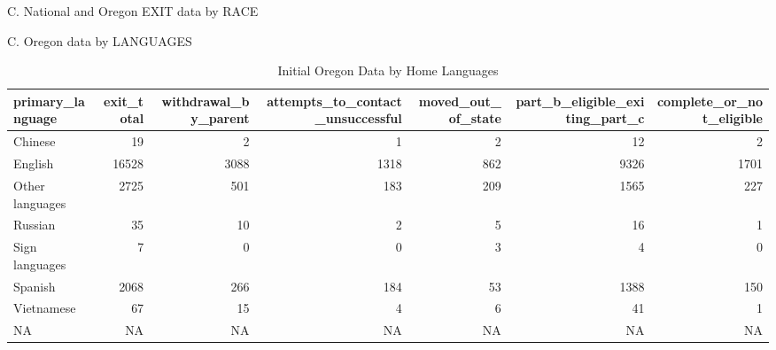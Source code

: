 \documentclass[
  letterpaper,
  DIV=11,
  numbers=noendperiod]{scrartcl}
\begin{document}
C. National and Oregon EXIT data by RACE

C. Oregon data by LANGUAGES

\begin{longtable}[l]{lrrrrrr}
\caption{Initial Oregon Data by Home Languages}\\
\toprule
primary\_language & exit\_total & withdrawal\_by\_parent & attempts\_to\_contact\_unsuccessful & moved\_out\_of\_state & part\_b\_eligible\_exiting\_part\_c & complete\_or\_not\_eligible\\
\midrule
Chinese & 19 & 2 & 1 & 2 & 12 & 2\\
English & 16528 & 3088 & 1318 & 862 & 9326 & 1701\\
Other languages & 2725 & 501 & 183 & 209 & 1565 & 227\\
Russian & 35 & 10 & 2 & 5 & 16 & 1\\
Sign languages & 7 & 0 & 0 & 3 & 4 & 0\\
\addlinespace
Spanish & 2068 & 266 & 184 & 53 & 1388 & 150\\
Vietnamese & 67 & 15 & 4 & 6 & 41 & 1\\
NA & NA & NA & NA & NA & NA & NA\\
\bottomrule
\end{longtable}
\end{document}
